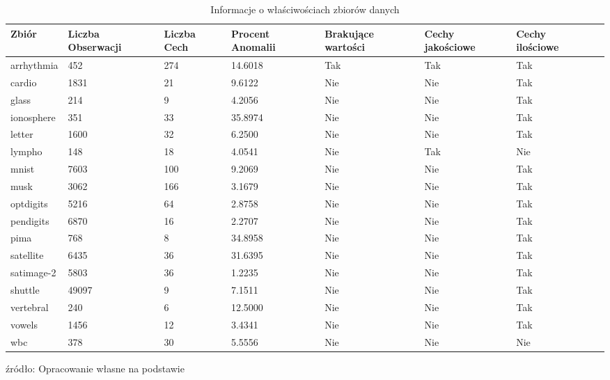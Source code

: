 \begin{table}[h]
    \centering
\begin{tabularx}{\textwidth}{lXXXXXXX}
\toprule
      Zbiór &  Liczba Obserwacji &   Liczba Cech &  Procent Anomalii &  Brakujące wartości & Cechy jakościowe & Cechy ilościowe \\ \hline
\midrule
arrhythmia &       452 &           274 &       14.6018 & Tak & Tak & Tak \\
    cardio &      1831 &            21 &        9.6122 & Nie & Nie & Tak  \\
     glass &       214 &             9 &        4.2056 & Nie & Nie & Tak \\
ionosphere &       351 &            33 &       35.8974 & Nie & Nie & Tak \\
    letter &      1600 &            32 &        6.2500 & Nie & Nie & Tak \\
    lympho &       148 &            18 &        4.0541 & Nie & Tak & Nie \\
     mnist &      7603 &           100 &        9.2069 & Nie & Nie & Tak \\
      musk &      3062 &           166 &        3.1679 & Nie & Nie & Tak \\
 optdigits &      5216 &            64 &        2.8758 & Nie & Nie & Tak \\
 pendigits &      6870 &            16 &        2.2707 & Nie & Nie & Tak \\
      pima &       768 &             8 &       34.8958 & Nie & Nie & Tak \\
 satellite &      6435 &            36 &       31.6395 & Nie & Nie & Tak \\
satimage-2 &      5803 &            36 &        1.2235 & Nie & Nie & Tak \\
   shuttle &     49097 &             9 &        7.1511 & Nie & Nie & Tak \\
 vertebral &       240 &             6 &       12.5000 & Nie & Nie & Tak \\
    vowels &      1456 &            12 &        3.4341 & Nie & Nie & Tak \\
       wbc &       378 &            30 &        5.5556 & Nie & Nie & Nie \\
\bottomrule
\end{tabularx}
    \caption{Informacje o właściwościach zbiorów danych}
    \footnotesize{źródło: Opracowanie własne na podstawie \cite{ODDS}}
    \label{tab:my_label}
\end{table}
